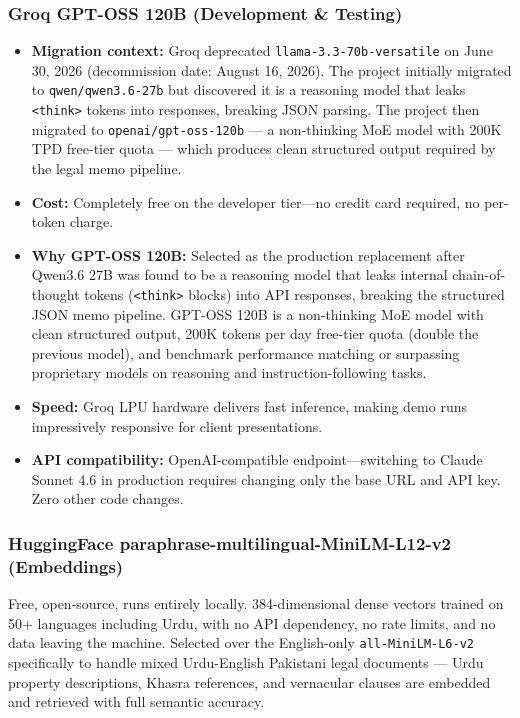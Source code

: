 \documentclass[12pt, a4paper]{article}
\begin{document}
\subsubsection{Groq GPT-OSS 120B (Development \& Testing)}

\begin{itemize}[leftmargin=1.5cm]
    \item \textbf{Migration context:} Groq deprecated \texttt{llama-3.3-70b-versatile}
    on June 30, 2026 (decommission date: August 16, 2026). The project initially
    migrated to \texttt{qwen/qwen3.6-27b} but discovered it is a reasoning model
    that leaks \texttt{<think>} tokens into responses, breaking JSON parsing.
    The project then migrated to \texttt{openai/gpt-oss-120b} --- a non-thinking
    MoE model with 200K TPD free-tier quota --- which produces clean structured
    output required by the legal memo pipeline.
    \item \textbf{Cost:} Completely free on the developer tier---no credit card
    required, no per-token charge.
    \item \textbf{Why GPT-OSS 120B:} Selected as the production replacement
    after Qwen3.6 27B was found to be a reasoning model that leaks internal
    chain-of-thought tokens (\texttt{<think>} blocks) into API responses,
    breaking the structured JSON memo pipeline. GPT-OSS 120B is a non-thinking
    MoE model with clean structured output, 200K tokens per day free-tier quota
    (double the previous model), and benchmark performance matching or surpassing
    proprietary models on reasoning and instruction-following tasks.
    \item \textbf{Speed:} Groq LPU hardware delivers fast inference, making
    demo runs impressively responsive for client presentations.
    \item \textbf{API compatibility:} OpenAI-compatible endpoint---switching to
    Claude Sonnet 4.6 in production requires changing only the base URL and
    API key. Zero other code changes.
\end{itemize}

\subsubsection{HuggingFace paraphrase-multilingual-MiniLM-L12-v2 (Embeddings)}

Free, open-source, runs entirely locally. 384-dimensional dense vectors trained
on 50+ languages including Urdu, with no API dependency, no rate limits, and no
data leaving the machine. Selected over the English-only
\texttt{all-MiniLM-L6-v2} specifically to handle mixed Urdu-English Pakistani
legal documents --- Urdu property descriptions, Khasra references, and
vernacular clauses are embedded and retrieved with full semantic accuracy.
\end{document}
